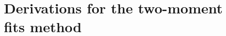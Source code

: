 \documentclass[preprint,12pt]{elsarticle}
\begin{document}
\begin{appendices}
\begin{description}
\end{description}

\section{Derivations for the two-moment fits method}
\label{AG}

\end{appendices}
\end{document}

